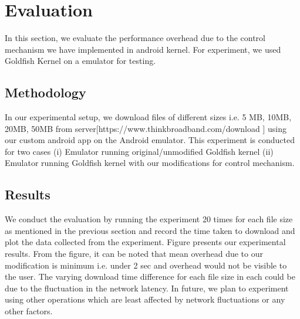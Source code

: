 \section{Evaluation}\label{evaluation}
In this section, we evaluate the performance overhead due to the control mechanism we have implemented in android kernel. For experiment, we used Goldfish Kernel on a emulator for testing. 

\subsection{Methodology}
In our experimental setup, we download files of different sizes i.e. 5 MB, 10MB, 20MB, 50MB from server[https://www.thinkbroadband.com/download ] using our custom android app on the Android emulator. This experiment is conducted for two cases (i) Emulator running original/unmodified Goldfish kernel  (ii) Emulator running Goldfish kernel with our modifications for control mechanism. 

\subsection{Results}
We conduct the evaluation by running the experiment 20 times for each file size as mentioned in the previous section and record the time taken to download and plot the data collected from the experiment. Figure {} presents our experimental results. From the figure, it can be noted that mean overhead due to our modification is minimum i.e. under 2 sec and overhead would not be visible to the user. The varying download time difference for each file size in each  could be due to the fluctuation in the network latency.
In future, we plan to experiment using other operations which are least affected by network fluctuations or any other factors.



